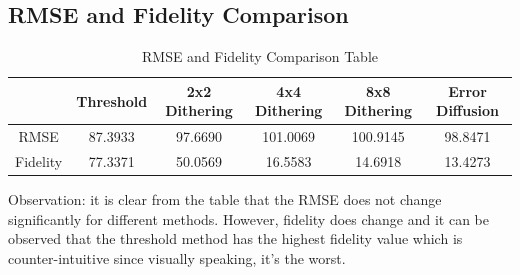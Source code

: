 \documentclass{article}
\begin{document}
\subsection{RMSE and Fidelity Comparison}
	\begin{table}[h!]
		\begin{center}
			\begin{tabular}{| c | c | c | c | c | c |}
			\hline
				& Threshold & 2x2 Dithering & 4x4 Dithering & 8x8 Dithering
				& Error Diffusion \\ \hline
				RMSE & 87.3933 & 97.6690 & 101.0069 & 100.9145 & 98.8471 \\ \hline
				Fidelity & 77.3371 & 50.0569 & 16.5583 & 14.6918 & 13.4273 \\ \hline
			\end{tabular}
			\caption{RMSE and Fidelity Comparison Table}
			\label{table:1}
		\end{center}
	\end{table}

	Observation: it is clear from the table that the RMSE does not change
	significantly for different methods. However, fidelity does change and it can
	be observed that the threshold method has the highest fidelity value which is
	counter-intuitive since visually speaking, it's the worst.
\end{document}
